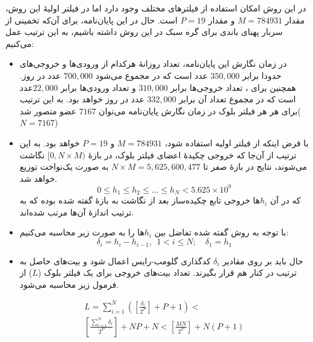  در این روش امکان استفاده از فیلتر‌های مختلف وجود دارد اما در فیلتر اولیهٔ این روش، مقدار $M=784931$ و مقدار $P=19$ است. حال در این پایان‌نامه، برای آن‌که تخمینی از سربار پهنای باندی برای گره سبک در این روش داشته باشیم، به این ترتیب عمل می‌کنیم:
 \begin{itemize}
 	\item {%
 در زمان نگارش این پایان‌نامه، تعداد روزانهٔ هرکدام از ورودی‌ها و خروجی‌های  حدودا برابر $350,000$ عدد است که در مجموع می‌شود $700,000$ عدد در روز. همچنین برای ، تعداد خروجی‌ها برابر $310,000$ و تعداد ورودی‌ها برابر $22,000$عدد است
 که در مجموع تعداد آن برابر $332,000$ عدد در روز خواهد بود.
به این ترتیب برای هر هر فیلتر بلوک در زمان نگارش پایان‌نامه می‌توان $7167$ عضو متصور شد($N=7167$)
}
\item{%
با فرض اینکه از فیلتر اولیه استفاده شود، $M=784931$ و $P=19$ خواهد بود. به این ترتیب از آن‌‌جا که خروجی چکیدهٔ اعضای فیلتر بلوک، در بازهٔ 
$[0, N\times M)$
نگاشت می‌شوند، نتایج در بازهٔ صفر تا 
$N\times M = 5,625,600,477$
به صورت یک‌نواخت توزیع خواهد شد.\\
\begin{equation}
\label{eq:Items_in_block_filter}
0\le h_1 \leq h_2 \leq \dots \leq h_N < 5.625 \times 10^{9}
\end{equation}
که در آن $h_i$ها خروجی تابع چکیده‌ساز بعد از نگاشت به بازهٔ گفته شده بوده که به ترتیب اندازهٔ آن‌ها مرتب شده‌اند.
}
\item{%
با توجه به روش گفته شده تفاضل بین $h_i$ها را به صورت زیر محاسبه می‌کنیم:
\begin{equation}
\label{eq:delta_value_in_block_filter}
\delta_i = h_i - h_{i-1}, \ \  1<i\leq N; \quad \delta_1 = h_1
\end{equation}
}
\item{%
حال باید بر روی مقادیر $ \delta_i $ کدگذاری گلومب-رایس اعمال شود و بیت‌های حاصل به ترتیب در کنار هم قرار بگیرند. تعداد بیت‌های خروجی برای یک فیلتر بلوک ($L$) از فرمول زیر محاسبه می‌شود.



\begin{multline}
\label{eq:size_in_block_filter}
L = \sum_{i=1}^{N} \left(\left[\frac{\delta_i}{2^P}\right] + P + 1\right) < \\
\left[\frac{\sum_{i=1}^{N} \delta_i }{2^P}\right] + NP + N  <
\left[\frac{ MN }{2^P}\right] + N(P + 1) 
\end{multline}

}
\end{itemize}
